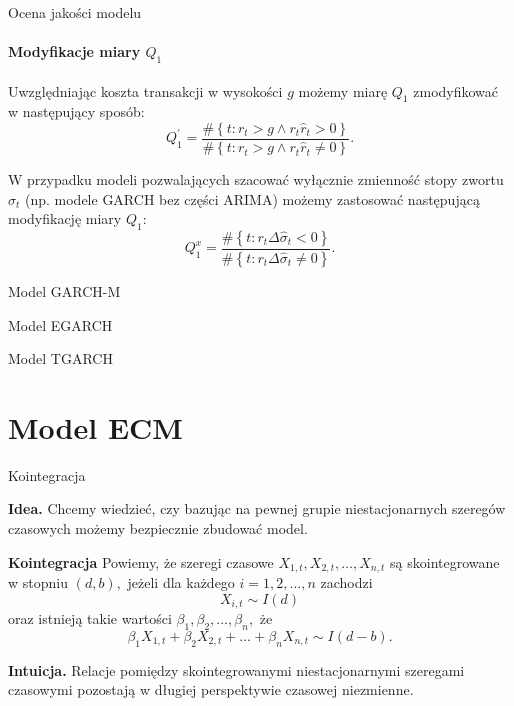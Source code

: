 \documentclass[a4paper, 11pt]{beamer}
\begin{document}
	\begin{frame}{Ocena jakości modelu}
		\framesubtitle{Modyfikacje miary $Q_1$}
		
		Uwzględniając koszta transakcji w wysokości $g$ możemy miarę $Q_1$
		zmodyfikować w następujący sposób:\[
			Q_1^{\prime} = \frac{
				\#\left\{t: r_t > g \wedge r_t \hat{r}_t > 0\right\}
			}{
				\#\left\{t: r_t > g \wedge r_t \hat{r}_t \neq 0\right\}
			}.
		\]
		
		W przypadku modeli pozwalających szacować wyłącznie zmienność stopy zwortu
		$\sigma_t$ (np. modele GARCH bez części ARIMA) możemy zastosować następującą
		modyfikację miary $Q_1:$ \[
			Q_1^{x} = \frac{
				\#\left\{t: r_t \Delta \hat{\sigma}_t < 0\right\}
			}{
				\#\left\{t: r_t \Delta \hat{\sigma}_t \neq 0\right\}
			}.
		\]
		
		
	\end{frame}
	
	\begin{frame}{Model GARCH-M}
	\end{frame}
	
	\begin{frame}{Model EGARCH}
	\end{frame}
	
	\begin{frame}{Model TGARCH}
	\end{frame}
	
	\section{Model ECM}
	
	\begin{frame}{Kointegracja}
		\begin{alert}{\textbf{Idea.}}
			Chcemy wiedzieć, czy bazując na pewnej grupie niestacjonarnych 
			szeregów czasowych możemy bezpiecznie zbudować model.
		\end{alert}
		\begin{block}{\textbf{Kointegracja}}
			Powiemy, że szeregi czasowe $X_{1,t}, X_{2,t}, \ldots, X_{n,t}$ są skointegrowane w stopniu $\left(d,b\right),$ jeżeli dla każdego $i=1,2,\ldots,n$ zachodzi \[
				X_{i,t} \sim I\left(d\right)
			\] oraz istnieją takie wartości $\beta_1,\beta_2,\ldots,\beta_n,$ że \[
				\beta_1 X_{1,t} + \beta_2 X_{2,t} + \ldots + \beta_n X_{n,t} \sim I\left(d - b\right).
			\]
		\end{block}
		\begin{alert}{\textbf{Intuicja.}}
			Relacje pomiędzy skointegrowanymi niestacjonarnymi szeregami 
			czasowymi pozostają w długiej perspektywie czasowej niezmienne.
		\end{alert}
	\end{frame}
	
\end{document}
